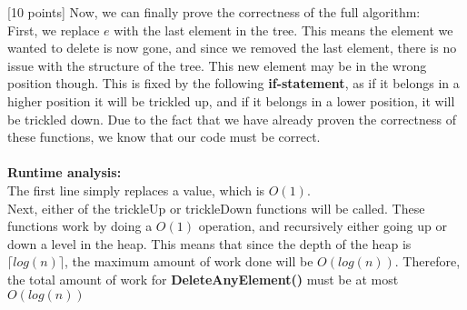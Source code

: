 \documentclass[12pt]{article}
\newcounter{ques}
\newenvironment{question}{\stepcounter{ques}{\noindent\bf Question \arabic{ques}:}}{\vspace{5mm}}
\begin{document}
\begin{question}[10 points]
Now, we can finally prove the correctness of the full algorithm:\\
First, we replace $e$ with the last element in the tree. This means the element we wanted to delete is now gone, and since we removed the last element, there is no issue with the structure of the tree. This new element may be in the wrong position though. This is fixed by the following \textbf{if-statement}, as if it belongs in a higher position it will be trickled up, and if it belongs in a lower position, it will be trickled down. Due to the fact that we have already proven the correctness of these functions, we know that our code must be correct.\\\\
\textbf{Runtime analysis:}\\
The first line simply replaces a value, which is $O(1)$.\\
Next, either of the trickleUp or trickleDown functions will be called. These functions work by doing a $O(1)$ operation, and recursively either going up or down a level in the heap. This means that since the depth of the heap is $\lceil log(n)\rceil$, the maximum amount of work done will be $O(log(n))$. Therefore, the total amount of work for \textbf{DeleteAnyElement()} must be at most $O(log(n))$
\end{question}



\end{document}
